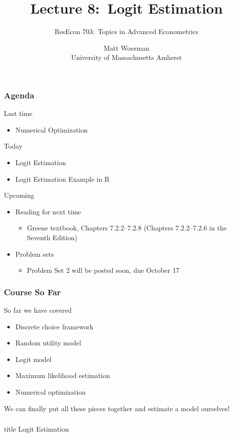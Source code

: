 \documentclass{beamer}\usepackage[]{graphicx}\usepackage[]{color}
\title[Lecture 8:\ Logit Estimation]{Lecture 8:\ Logit Estimation}
\author[ResEcon 703:\ Advanced Econometrics]{ResEcon 703:\ Topics in Advanced Econometrics}
\date{Matt Woerman\\University of Massachusetts Amherst}
\begin{document}
{ 
\begin{frame}[noframenumbering]
    \titlepage
\end{frame}
}

\begin{frame}\frametitle{Agenda}
    Last time
    \begin{itemize}
        \item Numerical Optimization
    \end{itemize}
    \vspace{2ex}
    Today
    \begin{itemize}
    	\item Logit Estimation
    	\item Logit Estimation Example in R
    \end{itemize}
    \vspace{2ex}
    Upcoming
    \begin{itemize}
        \item Reading for next time
        \begin{itemize}
            \item Greene textbook, Chapters 7.2.2--7.2.8 (Chapters 7.2.2--7.2.6 in the Seventh Edition)
        \end{itemize}
        \item Problem sets
        \begin{itemize}
            \item Problem Set 2 will be posted soon, due October 17
        \end{itemize}
    \end{itemize}
\end{frame}

\begin{frame}\frametitle{Course So Far}
    So far we have covered
    \begin{itemize}
    	\item Discrete choice framework
    	\item Random utility model
    	\item Logit model
    	\item Maximum likelihood estimation
    	\item Numerical optimization
    \end{itemize}
    \vspace{3ex}
    We can finally put all these pieces together and estimate a model ourselves!
\end{frame}

\begin{frame}\frametitle{}
    \vfill
    \centering
    \begin{beamercolorbox}[center]{title}
        \Large Logit Estimation
    \end{beamercolorbox}
    \vfill
\end{frame}
\end{document}
